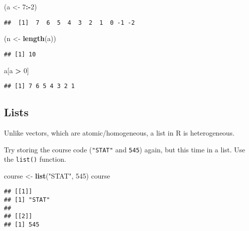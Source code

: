 \documentclass[]{article}
\newenvironment{Shaded}{\begin{snugshade}}{\end{snugshade}}
\newcommand{\KeywordTok}[1]{\textcolor[rgb]{0.13,0.29,0.53}{\textbf{#1}}}
\newcommand{\DecValTok}[1]{\textcolor[rgb]{0.00,0.00,0.81}{#1}}
\newcommand{\StringTok}[1]{\textcolor[rgb]{0.31,0.60,0.02}{#1}}
\newcommand{\OperatorTok}[1]{\textcolor[rgb]{0.81,0.36,0.00}{\textbf{#1}}}
\newcommand{\NormalTok}[1]{#1}
\begin{document}
\begin{Shaded}
\begin{Highlighting}[]
\NormalTok{(a <-}\StringTok{ }\DecValTok{7}\OperatorTok{:-}\DecValTok{2}\NormalTok{)}
\end{Highlighting}
\end{Shaded}

\begin{verbatim}
##  [1]  7  6  5  4  3  2  1  0 -1 -2
\end{verbatim}

\begin{Shaded}
\begin{Highlighting}[]
\NormalTok{(n <-}\StringTok{ }\KeywordTok{length}\NormalTok{(a))}
\end{Highlighting}
\end{Shaded}

\begin{verbatim}
## [1] 10
\end{verbatim}

\begin{Shaded}
\begin{Highlighting}[]
\NormalTok{a[a }\OperatorTok{>}\StringTok{ }\DecValTok{0}\NormalTok{]}
\end{Highlighting}
\end{Shaded}

\begin{verbatim}
## [1] 7 6 5 4 3 2 1
\end{verbatim}

\subsection{Lists}\label{lists}

Unlike vectors, which are atomic/homogeneous, a list in R is
heterogeneous.

Try storing the course code (\texttt{"STAT"} and \texttt{545}) again,
but this time in a list. Use the \texttt{list()} function.

\begin{Shaded}
\begin{Highlighting}[]
\NormalTok{course <-}\StringTok{ }\KeywordTok{list}\NormalTok{(}\StringTok{"STAT"}\NormalTok{, }\DecValTok{545}\NormalTok{)}
\NormalTok{course}
\end{Highlighting}
\end{Shaded}

\begin{verbatim}
## [[1]]
## [1] "STAT"
## 
## [[2]]
## [1] 545
\end{verbatim}
\end{document}
